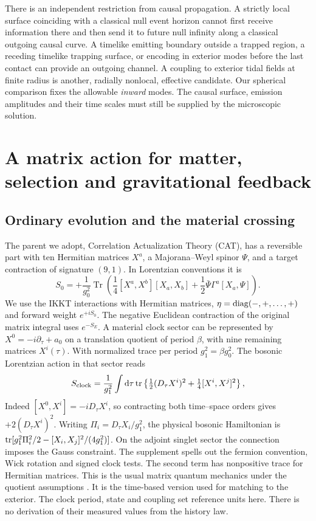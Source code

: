 \documentclass[11pt,a4paper]{article}
\newcommand{\Tr}{\operatorname{Tr}}
\newcommand{\dd}{\mathrm d}
\begin{document}
There is an independent restriction from causal propagation. A strictly local surface coinciding with a classical null event horizon cannot first receive information there and then send it to future null infinity along a classical outgoing causal curve. A timelike emitting boundary outside a trapped region, a receding timelike trapping surface, or encoding in exterior modes before the last contact can provide an outgoing channel. A coupling to exterior tidal fields at finite radius is another, radially nonlocal, effective candidate. Our spherical comparison fixes the allowable \emph{inward} modes. The causal surface, emission amplitudes and their time scales must still be supplied by the microscopic solution.

\section{A matrix action for matter, selection and gravitational feedback}\label{sec:parent}
\subsection{Ordinary evolution and the material crossing}
The parent we adopt, Correlation Actualization Theory (CAT), has a reversible part with ten Hermitian matrices \(X^a\), a Majorana--Weyl spinor \(\Psi\), and a target contraction of signature \((9,1)\). In Lorentzian conventions it is
\begin{equation}
 S_0=+\frac{1}{g_0^2}\Tr\left(\frac14[X^a,X^b][X_a,X_b]
             +\frac12\bar\Psi\Gamma^a[X_a,\Psi]\right).
 \label{eq:ikkt}
\end{equation}
We use the IKKT interactions \cite{ikkt} with Hermitian matrices, \(\eta={\rm diag}(-,+,\ldots,+)\) and forward weight \(e^{+iS_0}\). The negative Euclidean contraction of the original matrix integral uses \(e^{-S_E}\). A material clock sector can be represented by \(X^0=-i\partial_\tau+a_0\) on a translation quotient of period \(\beta\), with nine remaining matrices \(X^i(\tau)\). With normalized trace per period \(g_1^2=\beta g_0^2\). The bosonic Lorentzian action in that sector reads
\begin{equation}
 S_{\rm clock}=\frac1{g_1^2}\int\dd\tau\,\mathrm{tr}
 \left\{\tfrac12(D_\tau X^i)^2+\tfrac14[X^i,X^j]^2\right\},
 \label{eq:bfss}
\end{equation}
Indeed \([X^0,X^i]=-iD_\tau X^i\), so contracting both time--space orders gives \(+2(D_\tau X^i)^2\). Writing \(\Pi_i=D_\tau X_i/g_1^2\), the physical bosonic Hamiltonian is \({\rm tr}[g_1^2\Pi_i^2/2-[X_i,X_j]^2/(4g_1^2)]\). On the adjoint singlet sector the connection imposes the Gauss constraint. The supplement spells out the fermion convention, Wick rotation and signed clock tests. The second term has nonpositive trace for Hermitian matrices. This is the usual matrix quantum mechanics under the quotient assumptions \cite{bfss,taylor}. It is the time-based version used for matching to the exterior. The clock period, state and coupling set reference units here. There is no derivation of their measured values from the history law.
\end{document}
